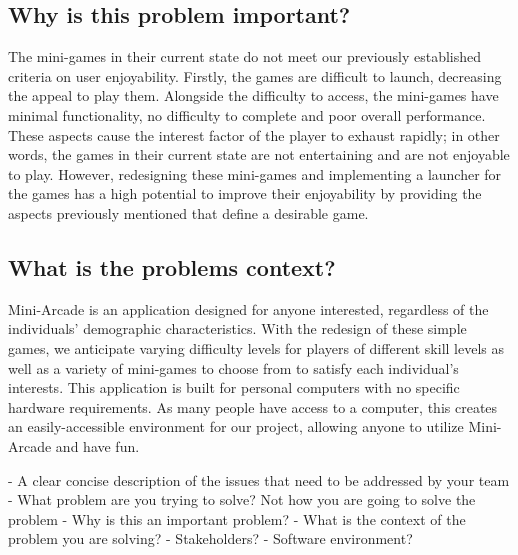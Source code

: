 \documentclass{article}
\begin{document}
\subsection{Why is this problem important?}
The mini-games in their current state do not meet our previously established criteria on user enjoyability. Firstly, the games are difficult to launch, decreasing the appeal to play them. Alongside the difficulty to access, the mini-games have minimal functionality, no difficulty to complete and poor overall performance. These aspects cause the interest factor of the player to exhaust rapidly; in other words, the games in their current state are not entertaining and are not enjoyable to play. However, redesigning these mini-games and implementing a launcher for the games has a high potential to improve their enjoyability by providing the aspects previously mentioned that define a desirable game.

\subsection{What is the problems context?}
Mini-Arcade is an application designed for anyone interested, regardless of the individuals' demographic characteristics. With the redesign of these simple games, we anticipate varying difficulty levels for players of different skill levels as well as a variety of mini-games to choose from to satisfy each individual's interests. This application is built for personal computers with no specific hardware requirements. As many people have access to a computer, this creates an easily-accessible environment for our project, allowing anyone to utilize Mini-Arcade and have fun.

- A clear concise description of the issues that need to be addressed by your team
- What problem are you trying to solve? Not how you are going to solve the problem
- Why is this an important problem?
- What is the context of the problem you are solving?
	- Stakeholders?
	- Software environment?
	





\end{document}
